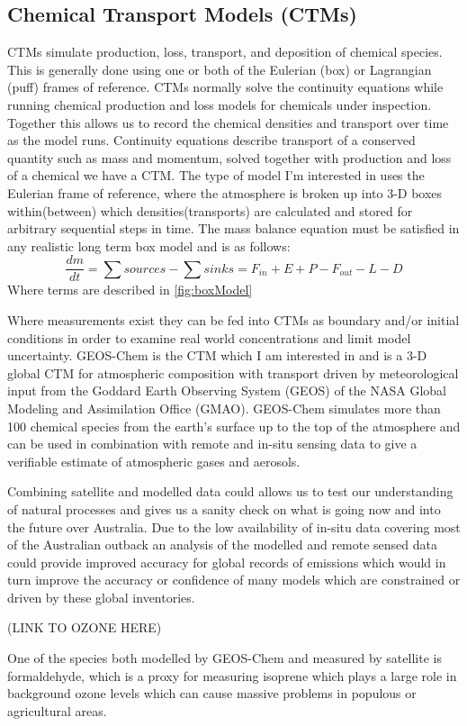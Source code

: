 \subsection{Chemical Transport Models (CTMs)}
CTMs simulate production, loss, transport, and deposition of chemical species.
This is generally done using one or both of the Eulerian (box) or Lagrangian (puff) frames of reference.
CTMs normally solve the continuity equations while running chemical production and loss models for chemicals under inspection. Together this allows us to record the chemical densities and transport over time as the model runs.
Continuity equations describe transport of a conserved quantity such as mass and momentum, solved together with production and loss of a chemical we have a CTM.
The type of model I'm interested in uses the Eulerian frame of reference, where the atmosphere is broken up into 3-D boxes within(between) which densities(transports) are calculated and stored for arbitrary sequential steps in time.
The mass balance equation must be satisfied in any realistic long term box model and is as follows: 
$$ \frac{dm}{dt} = \sum{sources}-\sum{sinks} = F_{in} + E + P - F_{out} - L - D $$
Where terms are described in \ref{fig:boxModel}

Where measurements exist they can be fed into CTMs as boundary and/or initial conditions in order to examine real world concentrations and limit model uncertainty.
GEOS-Chem is the CTM which I am interested in and is a 3-D global CTM for atmospheric composition with transport driven by meteorological input from the Goddard Earth Observing System (GEOS) of the NASA Global Modeling and Assimilation Office (GMAO).
GEOS-Chem simulates more than 100 chemical species from the earth's surface up to the top of the atmosphere and can be used in combination with remote and in-situ sensing data to give a verifiable estimate of atmospheric gases and aerosols.

Combining satellite and modelled data could allows us to test our understanding of natural processes and gives us a sanity check on what is going now and into the future over Australia.
Due to the low availability of in-situ data covering most of the Australian outback an analysis of the modelled and remote sensed data could provide improved accuracy for global records of emissions which would in turn improve the accuracy or confidence of many models which are constrained or driven by these global inventories.

(LINK TO OZONE HERE)

One of the species both modelled by GEOS-Chem and measured by satellite is formaldehyde, which is a proxy for measuring isoprene which plays a large role in background ozone levels which can cause massive problems in populous or agricultural areas.